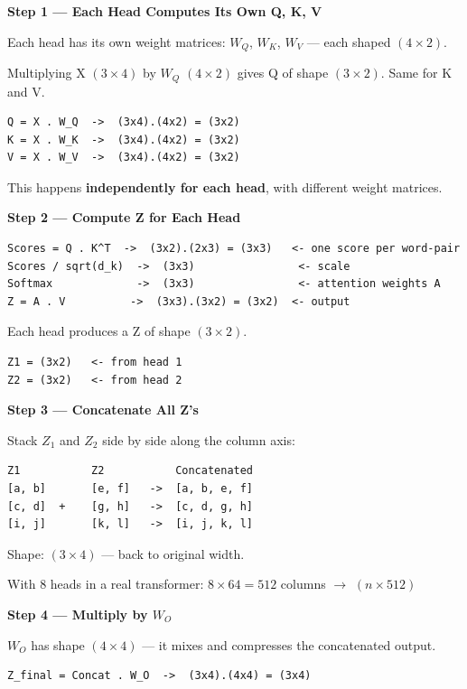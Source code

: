 \medskip
\textbf{Step 1 --- Each Head Computes Its Own Q, K, V}

Each head has its own weight matrices: $W_Q$, $W_K$, $W_V$ --- each shaped $(4 \times 2)$.

Multiplying X $(3\times4)$ by $W_Q$ $(4\times2)$ gives Q of shape $(3\times2)$. Same for K and V.

\begin{verbatim}
Q = X . W_Q  ->  (3x4).(4x2) = (3x2)
K = X . W_K  ->  (3x4).(4x2) = (3x2)
V = X . W_V  ->  (3x4).(4x2) = (3x2)
\end{verbatim}

This happens \textbf{independently for each head}, with different weight matrices.

\medskip
\textbf{Step 2 --- Compute Z for Each Head}

\begin{verbatim}
Scores = Q . K^T  ->  (3x2).(2x3) = (3x3)   <- one score per word-pair
Scores / sqrt(d_k)  ->  (3x3)                <- scale
Softmax             ->  (3x3)                <- attention weights A
Z = A . V          ->  (3x3).(3x2) = (3x2)  <- output
\end{verbatim}

Each head produces a Z of shape $(3 \times 2)$.

\begin{verbatim}
Z1 = (3x2)   <- from head 1
Z2 = (3x2)   <- from head 2
\end{verbatim}

\medskip
\textbf{Step 3 --- Concatenate All Z's}

Stack $Z_1$ and $Z_2$ side by side along the column axis:

\begin{verbatim}
Z1           Z2           Concatenated
[a, b]       [e, f]   ->  [a, b, e, f]
[c, d]  +    [g, h]   ->  [c, d, g, h]
[i, j]       [k, l]   ->  [i, j, k, l]
\end{verbatim}

Shape: $(3 \times 4)$ --- back to original width.

With 8 heads in a real transformer: $8 \times 64 = 512$ columns $\to$ $(n \times 512)$ \checkmark

\medskip
\textbf{Step 4 --- Multiply by $W_O$}

$W_O$ has shape $(4 \times 4)$ --- it mixes and compresses the concatenated output.

\begin{verbatim}
Z_final = Concat . W_O  ->  (3x4).(4x4) = (3x4)
\end{verbatim}

